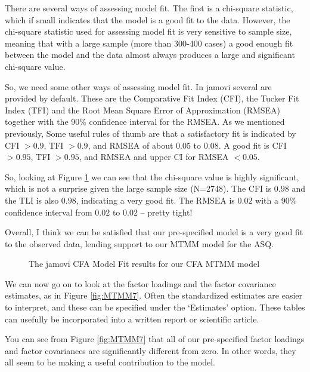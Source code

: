 There are several ways of assessing model fit. The first is a chi-square statistic, which if small indicates that the model is a good fit to the data. However, the chi-square statistic used for assessing model fit is very sensitive to sample size, meaning that with a large sample (more than 300-400 cases) a good enough fit between the model and the data almost always produces a large and significant chi-square value. 

So, we need some other ways of assessing model fit. In jamovi several are provided by default. These are the Comparative Fit Index (CFI), the Tucker Fit Index (TFI) and the Root Mean Square Error of Approximation (RMSEA) together with the 90\% confidence interval for the RMSEA. As we mentioned previously, Some useful rules of thumb are that a satisfactory fit is indicated by CFI $>0.9$, TFI $>0.9$, and RMSEA of about $0.05$ to $0.08$. A good fit is CFI $>0.95$, TFI $>0.95$, and RMSEA and upper CI for RMSEA $<0.05$. 

So, looking at Figure \ref{fig:MTMM6} we can see that the chi-square value is highly significant, which is not a surprise given the large sample size (N=2748). The CFI is $0.98$ and the TLI is also $0.98$, indicating a very good fit. The RMSEA is $0.02$ with a 90\% confidence interval from $0.02$ to $0.02$ – pretty tight! 

Overall, I think we can be satisfied that our pre-specified model is a very good fit to the observed data, lending support to our MTMM model for the ASQ.

\begin{figure}[!htb]
\begin{center}
\caption{The jamovi CFA Model Fit results for our CFA MTMM model}
\label{fig:MTMM6}
\HR
\end{center}
\end{figure}

We can now go on to look at the factor loadings and the factor covariance estimates, as in Figure \ref{fig:MTMM7}. Often the standardized estimates are easier to interpret, and these can be specified under the ‘Estimates’ option. These tables can usefully be incorporated into a written report or scientific article.

You can see from Figure \ref{fig:MTMM7} that all of our pre-specified factor loadings and factor covariances are significantly different from zero. In other words, they all seem to be making a useful contribution to the model.

